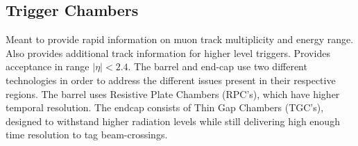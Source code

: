     \subsection{Trigger Chambers}
        Meant to provide rapid information on muon track multiplicity and energy range.
        Also provides additional track information for higher level triggers.
        Provides acceptance in range $|\eta| < 2.4$.
        The barrel and end-cap use two different technologies in order to address the different issues present in their respective regions.
        The barrel uses Resistive Plate Chambers (RPC's), which have higher temporal resolution. The endcap consists of Thin Gap Chambers (TGC's), designed to withstand higher radiation levels while still delivering high enough time resolution to tag beam-crossings.
